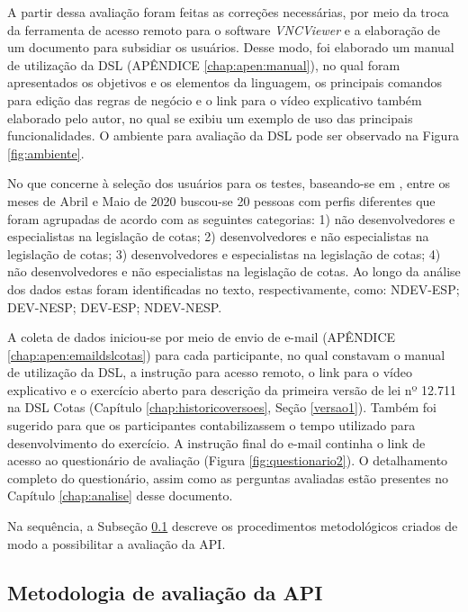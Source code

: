  A partir dessa avaliação foram feitas as correções necessárias, por meio da troca da ferramenta de acesso remoto para o software \textit{VNCViewer} e a elaboração de um documento para subsidiar os usuários. Desse modo, foi elaborado um manual de utilização da DSL (APÊNDICE \ref{chap:apen:manual}), no qual foram apresentados os objetivos e os elementos da linguagem, os principais comandos para edição das regras de negócio e o link para o vídeo explicativo também elaborado pelo autor, no qual se exibiu um exemplo de uso das principais funcionalidades. O ambiente para avaliação da DSL pode ser observado na Figura \ref{fig:ambiente}.
 
 
  
 
 No que concerne à seleção dos usuários para os testes, baseando-se em , entre os meses de Abril e Maio de 2020 buscou-se 20 pessoas com perfis diferentes que foram agrupadas de acordo com as seguintes categorias: 1) não desenvolvedores e especialistas na legislação de cotas; 2) desenvolvedores e não especialistas na legislação de cotas; 3) desenvolvedores e especialistas na legislação de cotas; 4) não desenvolvedores e não especialistas na legislação de cotas. Ao longo da análise dos dados estas foram identificadas no texto, respectivamente, como: NDEV-ESP; DEV-NESP; DEV-ESP; NDEV-NESP. 

 A coleta de dados iniciou-se por meio de envio de e-mail (APÊNDICE \ref{chap:apen:emaildslcotas}) para cada participante, no qual constavam o manual de utilização da DSL, a instrução para acesso remoto, o link para o vídeo explicativo e o exercício aberto para descrição da primeira versão de lei nº 12.711 na DSL Cotas (Capítulo \ref{chap:historicoversoes}, Seção \ref{versao1}). Também foi sugerido para que os participantes contabilizassem o tempo utilizado para desenvolvimento do exercício. A instrução final do e-mail continha o link de acesso ao questionário de avaliação (Figura \ref{fig:questionario2}). O detalhamento completo do questionário, assim como as perguntas avaliadas estão presentes no Capítulo \ref{chap:analise} desse documento.

 
 
 \newpage
 Na sequência, a Subseção \ref{metodoapi} descreve os procedimentos metodológicos criados de modo a possibilitar a avaliação da \gls{API}.
 

\subsection{Metodologia de avaliação da API}
\label{metodoapi}


